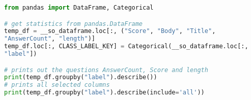 \begin{comment}
When retrieving the questions from the database, the vote score was set to less than -10 for bad question and greater than 50 for good questions (retrieval limit set to 10,000; 20,000 total). 
However, the vote score was set too low for the bad questions, since only 683 rows was returned. 
Therefore, the score was then set to less than -5. 
What was also found when using pandas.Categorical to get an overview (code snippet in Listing \ref{lst:pandas_categorical} and result in Table \ref{tab:pandas_categorical}), 
one can see that for the 10,000 bad questions, the average vote score was -7. This could be an indicator that when a question has a vote score below -5, they are ignored.
\end{comment}

\begin{lstlisting}[caption={Getting Categorical data from pandas.DataFrame}, 
label={lst:pandas_categorical}, language={Python}, basicstyle=\small] 
from pandas import DataFrame, Categorical

# get statistics from pandas.DataFrame
temp_df = __so_dataframe.loc[:, ("Score", "Body", "Title", 
"AnswerCount", "length")]
temp_df.loc[:, CLASS_LABEL_KEY] = Categorical(__so_dataframe.loc[:, 
"label"])

# prints out the questions AnswerCount, Score and length
print(temp_df.groupby("label").describe())
# prints all selected columns
print(temp_df.groupby("label").describe(include='all'))
\end{lstlisting}

